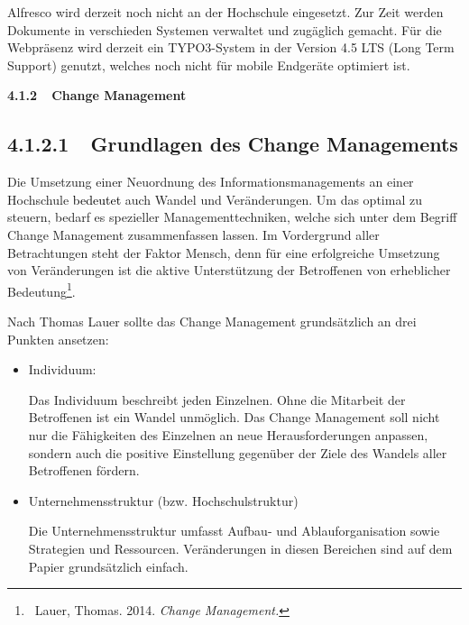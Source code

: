 \documentclass[a4paper]{article}
\newcommand\liststyleLi{%
\renewcommand\labelitemi{•}
\renewcommand\labelitemii{◦}
\renewcommand\labelitemiii{${\blacksquare}$}
\renewcommand\labelitemiv{•}
}
\begin{document}
{\sffamily\color{black}
Alfresco wird derzeit noch nicht an der Hochschule eingesetzt. Zur Zeit werden Dokumente in verschieden Systemen
verwaltet und zugäglich gemacht. Für die Webpräsenz wird derzeit ein TYPO3-System in der Version 4.5 LTS (Long Term
Support) genutzt, welches noch nicht für mobile Endgeräte optimiert ist. }


\bigskip

{\sffamily\bfseries
4.1.2\ \ Change Management}

\subsection[4.1.2.1\ \ Grundlagen des Change Managements]{\bfseries 4.1.2.1\ \ Grundlagen des Change Managements}
{\sffamily
Die Umsetzung einer Neuordnung des Informationsmanagements an einer Hochschule \textcolor{black}{bedeutet} auch Wandel
und Veränderungen. Um das optimal zu steuern, bedarf es spezieller Managementtechniken, welche sich unter dem Begriff
Change Management zusammenfassen lassen. Im Vordergrund aller Betrachtungen steht der Faktor Mensch, denn für eine
erfolgreiche Umsetzung von Veränderungen ist die aktive Unterstützung der Betroffenen von erheblicher
Bedeutung\footnote{\textsf{\ Lauer, Thomas. 2014.
}\textsf{\textit{\textcolor[rgb]{0.06666667,0.06666667,0.06666667}{Change Management.}}}}.}


\bigskip

{\sffamily
Nach Thomas Lauer sollte das Change Management grundsätzlich an drei Punkten ansetzen:}


\bigskip

\liststyleLi
\begin{itemize}
\item {\sffamily
Individuum:}

{\sffamily
Das Individuum beschreibt jeden Einzelnen. Ohne die Mitarbeit der Betroffenen ist ein Wandel unmöglich. Das Change
Management soll nicht nur die Fähigkeiten des Einzelnen an neue Herausforderungen anpassen, sondern auch die positive
Einstellung gegenüber der Ziele des Wandels aller Betroffenen fördern. \ }
\end{itemize}

\bigskip

\liststyleLi
\begin{itemize}
\item {\sffamily
Unternehmensstruktur (bzw. Hochschulstruktur)}

{\sffamily
Die Unternehmensstruktur umfasst Aufbau- und Ablauforganisation sowie Strategien und Ressourcen. Veränderungen in diesen
Bereichen sind auf dem Papier grundsätzlich einfach.}
\end{itemize}
\end{document}
